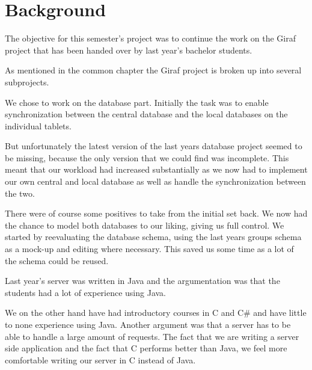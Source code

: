 \section{Background}
The objective for this semester's project was to continue the work on the Giraf project that has been handed over by last year's bachelor students. 

As mentioned in the common chapter the Giraf project is broken up into several subprojects. 

We chose to work on the database part. Initially the task was to enable synchronization between the central database and the local databases on the individual tablets.

But unfortunately the latest version of the last years database project seemed to be missing, because the only version that we could find was incomplete. This meant that our workload had increased substantially as we now had to implement our own central and local database as well as handle the synchronization between the two.

There were of course some positives to take from the initial set back. We now had the chance to model both databases to our liking, giving us full control. We started by reevaluating the database schema, using the last years groups schema as a mock-up and editing where necessary. This saved us some time as a lot of the schema could be reused.

Last year's server was written in Java and the argumentation was that the students had a lot of experience using Java.

We on the other hand have had introductory courses in C and C\# and have little to none experience using Java. Another argument was that a server has to be able to handle a large amount of requests. The fact that we are writing a server side application and the fact that C performs better than Java, we feel more comfortable writing our server in C instead of Java.
